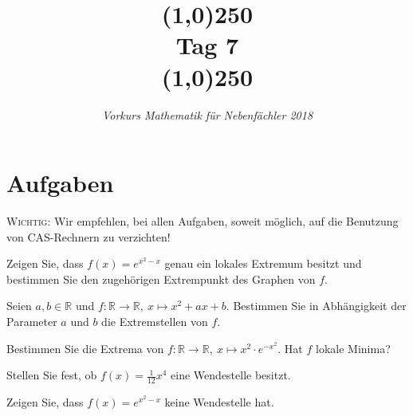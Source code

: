 \documentclass[11pt]{article}
\begin{document}
\title{\line(1,0){250}\\Tag 7\\\line(1,0){250}}
\date{}
\author{\itshape Vorkurs Mathematik für Nebenfächler 2018}
\maketitle

\section*{Aufgaben}
\textsc{Wichtig:} Wir empfehlen, bei allen Aufgaben, soweit möglich, auf die Benutzung von CAS-Rechnern zu verzichten!
\begin{task}
	Zeigen Sie, dass $f(x)=e^{x^2-x}$ genau ein lokales Extremum besitzt und bestimmen Sie den zugeh\" origen Extrempunkt des Graphen von $f$.
\end{task}
\begin{task}
	Seien $a,b\in \mathbb{R}$ und $f:\mathbb{R}\to \mathbb{R},~x\mapsto x^2+ax+b$. Bestimmen Sie in Abhängigkeit der Parameter $a$ und $b$ die Extremstellen von $f$.
\end{task}
\begin{task}
	Bestimmen Sie die Extrema von $f:\mathbb{R}\to \mathbb{R},~x\mapsto x^2\cdot e^{-x^2}$. Hat $f$ lokale Minima?
\end{task}
\dotfill
\begin{task}
	Stellen Sie fest, ob $f(x)=\frac{1}{12}x^4$ eine Wendestelle besitzt.
\end{task}
\begin{task}
	Zeigen Sie, dass $f(x)= e^{x^2-x}$ keine Wendestelle hat.
\end{task}


\end{document}
